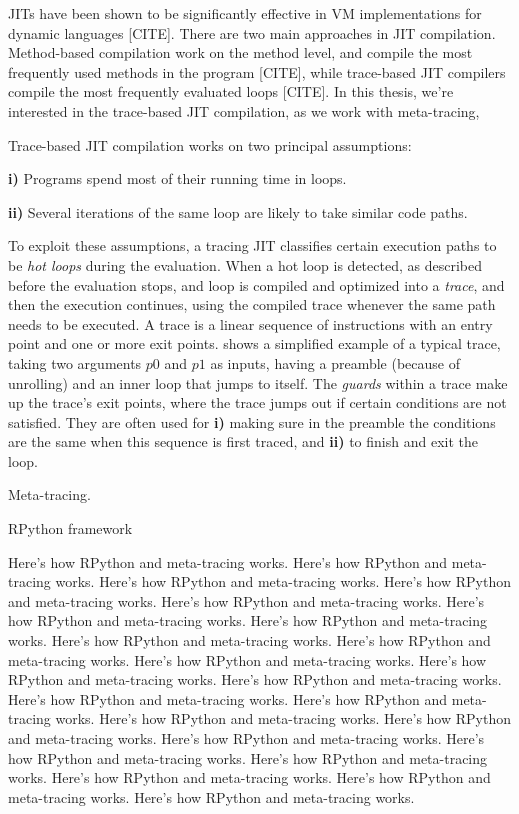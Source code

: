 JITs have been shown to be significantly effective in VM
implementations for dynamic languages [CITE]. There are two main
approaches in JIT compilation. Method-based compilation work on the
method level, and compile the most frequently used methods in the
program [CITE], while trace-based JIT compilers compile the most
frequently evaluated loops [CITE]. In this thesis, we're interested in
the trace-based JIT compilation, as we work with meta-tracing,

Trace-based JIT compilation works on two principal assumptions:

\textbf{i)} Programs spend most of their running time in loops.

\textbf{ii)} Several iterations of the same loop are likely to take
similar code paths.

To exploit these assumptions, a tracing JIT classifies certain
execution paths to be \emph{hot loops} during the evaluation. When a
hot loop is detected, as described before the evaluation stops, and
loop is compiled and optimized into a \emph{trace}, and then the
execution continues, using the compiled trace whenever the same path
needs to be executed. A trace is a linear sequence of instructions
with an entry point and one or more exit points. 
shows a simplified example of a typical trace, taking two arguments
$p0$ and $p1$ as inputs, having a preamble (because of unrolling) and
an inner loop that jumps to itself. The \emph{guards} within a trace
make up the trace's exit points, where the trace jumps out if certain
conditions are not satisfied. They are often used for \textbf{i)}
making sure in the preamble the conditions are the same when this
sequence is first traced, and \textbf{ii)} to finish and exit the
loop.

Meta-tracing.

RPython framework


Here's how RPython and meta-tracing works. Here's how RPython and meta-tracing works. Here's how RPython and meta-tracing works. Here's how RPython and meta-tracing works. Here's how RPython and meta-tracing works. Here's how RPython and meta-tracing works. Here's how RPython and meta-tracing works. Here's how RPython and meta-tracing works. Here's how RPython and meta-tracing works. Here's how RPython and meta-tracing works. Here's how RPython and meta-tracing works. Here's how RPython and meta-tracing works. Here's how RPython and meta-tracing works. Here's how RPython and meta-tracing works. Here's how RPython and meta-tracing works. Here's how RPython and meta-tracing works. Here's how RPython and meta-tracing works. Here's how RPython and meta-tracing works. Here's how RPython and meta-tracing works. Here's how RPython and meta-tracing works. Here's how RPython and meta-tracing works. Here's how RPython and meta-tracing works.


